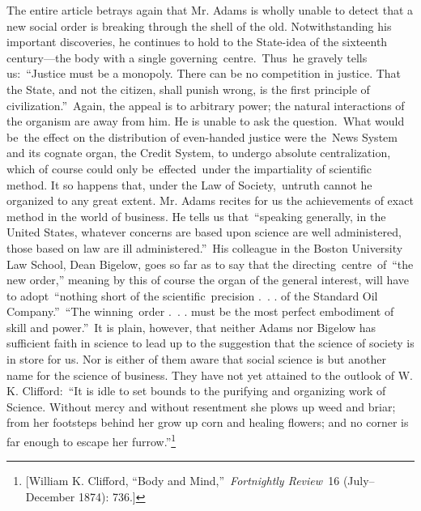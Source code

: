 \documentclass[openany,nobib]{tufte-book}
\begin{document}
The entire article betrays again that Mr. Adams is wholly unable to
detect that a new social order is breaking through the shell of the old.
Notwithstanding his important discoveries, he continues to hold to the
State-idea of the sixteenth century---the body with a single
governing~centre.~Thus~he gravely tells us:~``Justice must be a
monopoly. There can be no competition in justice. That the State, and
not the citizen, shall punish wrong, is the first principle of
civilization.''~Again, the appeal is to arbitrary power; the natural
interactions of the organism are away from him. He is unable to ask the
question.~What would be~the effect on the distribution of even-handed
justice were the~News System and its cognate organ, the Credit System,
to undergo absolute centralization, which of course could only
be~effected~under the impartiality of scientific method. It so happens
that, under the Law of Society,~untruth cannot he organized to any great
extent. Mr. Adams recites for us the achievements of exact method in the
world of business. He tells us that~``speaking generally, in the United
States, whatever concerns are based upon science are well administered,
those based on law are ill administered.''~His colleague in the Boston
University Law School, Dean Bigelow, goes so far as to say that the
directing~centre~of~``the new order,'' meaning by this of course the
organ of the general interest, will have to adopt~``nothing short of the
scientific~precision .~. . of the Standard Oil Company.''~``The
winning~order .~. . must be the most perfect embodiment of skill and
power.''~It is plain, however, that neither Adams nor Bigelow has
sufficient faith in science to lead up to the suggestion that the
science of society is in store for us. Nor is either of them aware that
social science is but another name for the science of business. They
have not yet attained to the outlook of W. K. Clifford:~``It is idle to
set bounds to the purifying and organizing work of Science. Without
mercy and without resentment she plows up weed and briar; from her
footsteps behind her grow up corn and healing flowers; and no corner is
far enough to escape her furrow.''\footnote{{[}William K. Clifford,
  ``Body and Mind,''~\emph{Fortnightly Review~}16 (July--December 1874):
  736.{]}}
\end{document}
